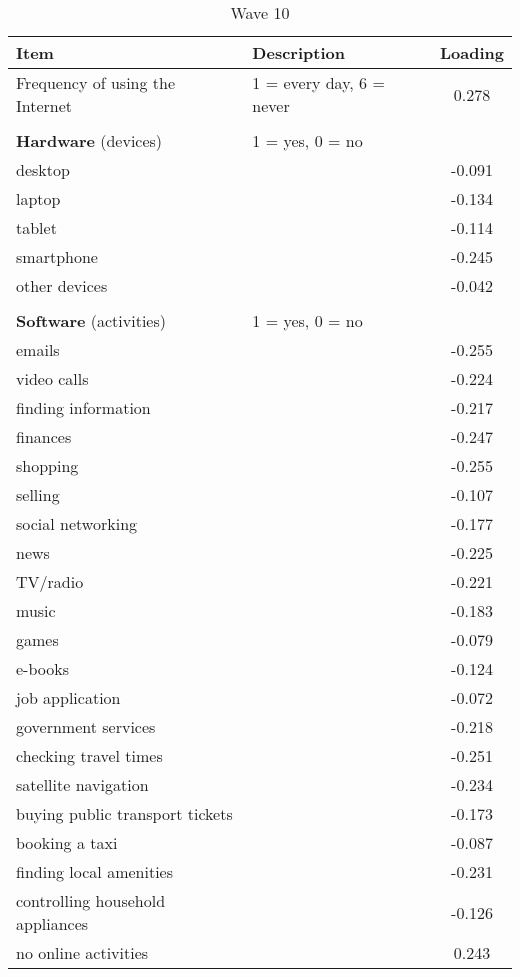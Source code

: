 \documentclass[12pt]{article}
\begin{document}
\begin{table}[h!]
        \begin{subtable}{\textwidth}
            \centering
            \caption{Wave 10}
            \begin{tabular}{llc}
                \toprule
                Item & Description & Loading \\
                \midrule
                Frequency of using the Internet & 1 = every day, 6 = never & 0.278 \\
                & & \\
                \textbf{Hardware} (devices) & 1 = yes, 0 = no & \\
                desktop &  & -0.091 \\
                laptop &  & -0.134 \\
                tablet &  & -0.114 \\
                smartphone &  & -0.245 \\
                other devices &  & -0.042 \\
                & & \\
                \textbf{Software} (activities) & 1 = yes, 0 = no & \\
                emails &  & -0.255 \\
                video calls &  & -0.224 \\
                finding information &  & -0.217 \\
                finances &  & -0.247 \\
                shopping &  & -0.255 \\
                selling &  & -0.107 \\
                social networking &  & -0.177 \\
                news &  & -0.225 \\
                TV/radio &  & -0.221 \\
                music &  & -0.183 \\
                games &  & -0.079 \\
                e-books &  & -0.124 \\
                job application &  & -0.072 \\
                government services &  & -0.218 \\
                checking travel times &  & -0.251 \\
                satellite navigation &  & -0.234 \\
                buying public transport tickets &  & -0.173 \\
                booking a taxi &  & -0.087 \\
                finding local amenities &  & -0.231 \\
                controlling household appliances &  & -0.126 \\
                no online activities &  & 0.243 \\
                \bottomrule
            \end{tabular}
        \end{subtable}

    \end{table}
\end{document}
